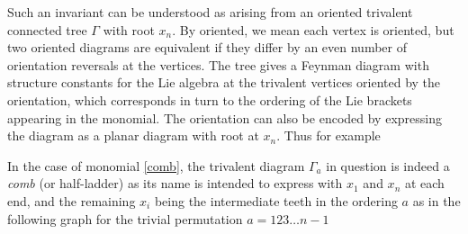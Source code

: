 \documentclass[11pt]{article}
\newcommand{\1}{{\rm 1\hskip-0.25em I}}
\begin{document}
Such an invariant can be understood as arising from an oriented trivalent connected tree $\Gamma$ with  root $x_n$.  By oriented, we mean each  vertex is oriented, but two oriented diagrams are equivalent if they differ by an even number of orientation reversals at the vertices.  The tree gives a Feynman diagram with structure constants for the Lie algebra at the trivalent vertices oriented by the orientation, which corresponds in turn to the ordering of the Lie brackets appearing in the monomial.  The orientation can also be encoded by expressing the diagram as a planar diagram with  root at $x_n$. Thus for example
\begin{adjustbox}{width=.8\textwidth
,center}%
\end{adjustbox}

 In the case of monomial \eqref{comb}, the trivalent diagram $\Gamma_a$ in question is indeed a \emph{comb} (or half-ladder) as its name is intended to express with $x_1$ and $x_n$ at each end, and the remaining $x_i$ being the intermediate teeth in the ordering $a$ as in the following graph %
  for the trivial permutation $a=123\ldots n-1$

\begin{center}
\begin{adjustbox}{width=.5\textwidth,center}%
\end{adjustbox}
\end{center}  
  
\end{document}
